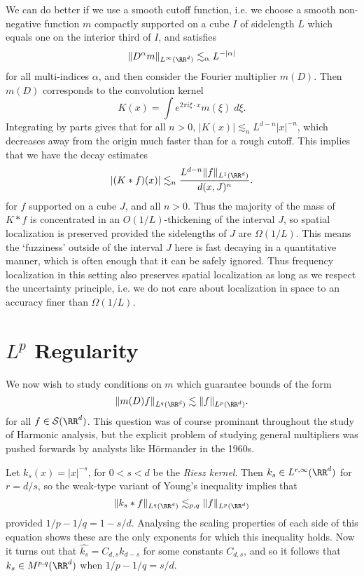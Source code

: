 We can do better if we use a smooth cutoff function, i.e. we choose a smooth non-negative function $m$ compactly supported on a cube $I$ of sidelength $L$ which equals one on the interior third of $I$, and satisfies
%
\[ \| D^\alpha m \|_{L^\infty(\RR^d)} \lesssim_\alpha L^{-|\alpha|} \]
%
for all multi-indices $\alpha$, and then consider the Fourier multiplier $m(D)$. Then $m(D)$ corresponds to the convolution kernel
%
\[ K(x) = \int e^{2 \pi i \xi \cdot x} m(\xi)\; d\xi. \]
%
Integrating by parts gives that for all $n > 0$, $|K(x)| \lesssim_n L^{d-n} |x|^{-n}$, which decreases away from the origin much faster than for a rough cutoff. This implies that we have the decay estimates
%
\[ |(K * f)(x)| \lesssim_n \frac{L^{d-n} \| f \|_{L^1(\RR^d)}}{d(x,J)^n}. \]
%
for $f$ supported on a cube $J$, and all $n > 0$. Thus the majority of the mass of $K * f$ is concentrated in an $O(1/L)$-thickening of the interval $J$, so spatial localization is preserved provided the sidelengths of $J$ are $\Omega(1/L)$. This means the `fuzziness' outside of the interval $J$ here is fast decaying in a quantitative manner, which is often enough that it can be safely ignored. Thus frequency localization in this setting also preserves spatial localization as long as we respect the uncertainty principle, i.e. we do not care about localization in space to an accuracy finer than $\Omega(1/L)$.









\section{$L^p$ Regularity}

We now wish to study conditions on $m$ which guarantee bounds of the form
%
\[ \| m(D) f \|_{L^q(\RR^d)} \lesssim \| f \|_{L^p(\RR^d)}. \]
%
for all $f \in \mathcal{S}(\RR^d)$. This question was of course prominant throughout the study of Harmonic analysis, but the explicit problem of studying general multipliers was pushed forwards by analysts like H\"{o}rmander in the 1960s.

\begin{example}
    Let $k_s(x) = |x|^{-s}$, for $0 < s < d$ be the \emph{Riesz kernel}. Then $k_s \in L^{r,\infty}(\RR^d)$ for $r = d/s$, so the weak-type variant of Young's inequality implies that
    \[ \| k_s * f \|_{L^q(\RR^d)} \lesssim_{p,q} \| f \|_{L^p(\RR^d)} \]
    provided $1/p - 1/q = 1 - s/d$. Analysing the scaling properties of each side of this equation shows these are the only exponents for which this inequality holds. Now it turns out that $\widehat{k_s} = C_{d,s} k_{d-s}$ for some constants $C_{d,s}$, and so it follows that $k_s \in M^{p,q}(\RR^d)$ when $1/p - 1/q = s/d$.
\end{example}

